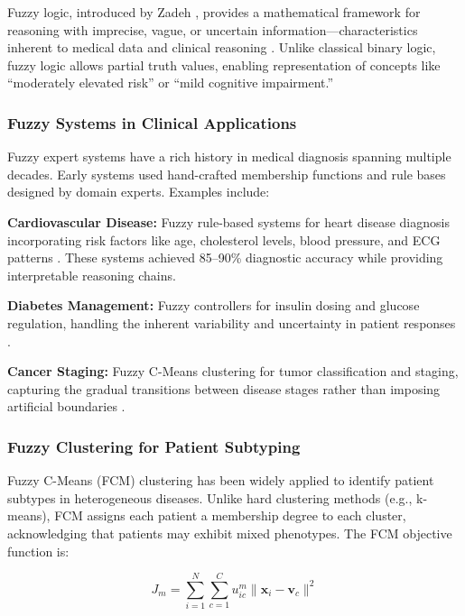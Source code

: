 \documentclass[conference]{IEEEtran}
\begin{document}
Fuzzy logic, introduced by Zadeh \cite{Zadeh1965}, provides a mathematical framework for reasoning with imprecise, vague, or uncertain information—characteristics inherent to medical data and clinical reasoning \cite{Torres2006}. Unlike classical binary logic, fuzzy logic allows partial truth values, enabling representation of concepts like ``moderately elevated risk'' or ``mild cognitive impairment.''

\subsubsection{Fuzzy Systems in Clinical Applications}

Fuzzy expert systems have a rich history in medical diagnosis spanning multiple decades. Early systems used hand-crafted membership functions and rule bases designed by domain experts. Examples include:

\textbf{Cardiovascular Disease:} Fuzzy rule-based systems for heart disease diagnosis incorporating risk factors like age, cholesterol levels, blood pressure, and ECG patterns \cite{Adeli2010}. These systems achieved 85--90\% diagnostic accuracy while providing interpretable reasoning chains.

\textbf{Diabetes Management:} Fuzzy controllers for insulin dosing and glucose regulation, handling the inherent variability and uncertainty in patient responses \cite{Kadhim2011}.

\textbf{Cancer Staging:} Fuzzy C-Means clustering for tumor classification and staging, capturing the gradual transitions between disease stages rather than imposing artificial boundaries \cite{Guzman2005}.

\subsubsection{Fuzzy Clustering for Patient Subtyping}

Fuzzy C-Means (FCM) clustering \cite{Bezdek1981} has been widely applied to identify patient subtypes in heterogeneous diseases. Unlike hard clustering methods (e.g., k-means), FCM assigns each patient a membership degree to each cluster, acknowledging that patients may exhibit mixed phenotypes. The FCM objective function is:

\begin{equation}
J_m = \sum_{i=1}^{N} \sum_{c=1}^{C} u_{ic}^m \|\mathbf{x}_i - \mathbf{v}_c\|^2
\end{equation}
\end{document}
